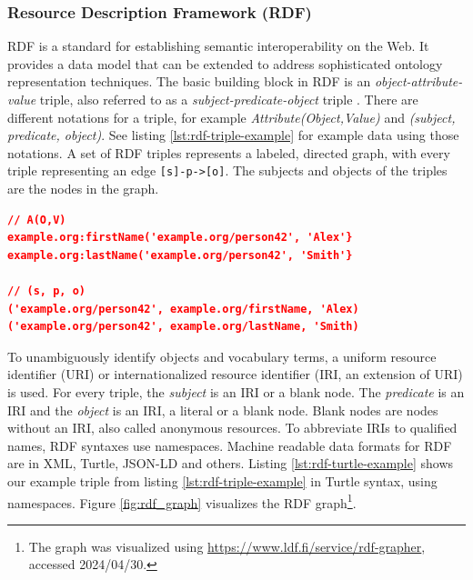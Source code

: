 \subsubsection{Resource Description Framework (RDF)}
RDF is a standard for establishing semantic interoperability on the Web. 
It provides a data model that can be extended to address sophisticated ontology representation techniques.
The basic building block in RDF is an \textit{object-attribute-value} triple\cite{decker2000semantic}, also referred to as a \textit{subject-predicate-object} triple \cite{hogan2021knowledge}.
There are different notations for a triple, for example \textit{Attribute(Object,Value)} and \textit{(subject, predicate, object)}.
See listing \ref{lst:rdf-triple-example} for example data using those notations.
A set of RDF triples represents a labeled, directed graph, with every triple representing an edge \texttt{[s]-p->[o]}.
The subjects and objects of the triples are the nodes in the graph.


\begin{lstlisting}[language=json,basicstyle=\scriptsize,firstnumber=1,caption={Different notations for an RDF triple},captionpos=b,label={lst:rdf-triple-example}]
// A(O,V)
example.org:firstName('example.org/person42', 'Alex'}
example.org:lastName('example.org/person42', 'Smith'}

// (s, p, o)
('example.org/person42', example.org/firstName, 'Alex)
('example.org/person42', example.org/lastName, 'Smith)
\end{lstlisting}


To unambiguously identify objects and vocabulary terms, a uniform resource identifier (URI)\cite{berners2005uniform} or internationalized resource identifier (IRI, an extension of URI)\cite{rfc3987} is used.
For every triple, the \textit{subject} is an IRI or a blank node.
The \textit{predicate} is an IRI and the \textit{object} is an IRI, a literal or a blank node.
Blank nodes are nodes without an IRI, also called anonymous resources.
To abbreviate IRIs to qualified names, RDF syntaxes use namespaces.\cite{w3c_rdf}
Machine readable data formats for RDF are in XML\cite{rdf_xml_syntax}, Turtle\cite{beckett2014rdf}, JSON-LD\cite{sporny2020json} and others\cite{ntriples, nquads, trig, grlicky2005overview}.
Listing \ref{lst:rdf-turtle-example} shows our example triple from listing \ref{lst:rdf-triple-example} in Turtle syntax, using namespaces.
Figure \ref{fig:rdf_graph} visualizes the RDF graph\footnote{\label{footnote:graph_visualizer}The graph was visualized using \url{https://www.ldf.fi/service/rdf-grapher}, accessed 2024/04/30.}.

